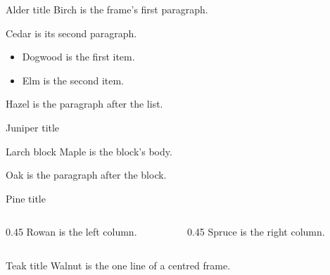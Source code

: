 \documentclass{beamer}
\begin{document}
\begin{frame}[t]{Alder title}
Birch is the frame's first paragraph.

Cedar is its second paragraph.
\begin{itemize}
\item Dogwood is the first item.
\item Elm is the second item.
\end{itemize}
Hazel is the paragraph after the list.
\end{frame}
\begin{frame}[t]{Juniper title}
\begin{block}{Larch block}
Maple is the block's body.
\end{block}
Oak is the paragraph after the block.
\end{frame}
\begin{frame}[t]{Pine title}
\begin{columns}[T]
\begin{column}{0.45\textwidth}
Rowan is the left column.
\end{column}
\begin{column}{0.45\textwidth}
Spruce is the right column.
\end{column}
\end{columns}
\end{frame}
\begin{frame}{Teak title}
Walnut is the one line of a centred frame.
\end{frame}
\end{document}
